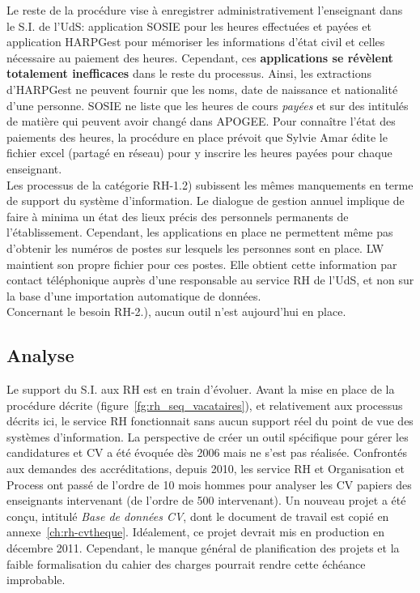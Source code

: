 \documentclass{book}
\begin{document}
Le reste de la procédure vise à enregistrer administrativement l'enseignant
dans le S.I. de l'UdS: application SOSIE pour les heures effectuées et payées
et application HARPGest pour mémoriser les informations d'état civil et celles
nécessaire au paiement des heures. 
Cependant, ces \textbf{applications se révèlent totalement inefficaces} dans 
le reste du processus. Ainsi, les extractions d'HARPGest ne peuvent fournir
que les noms, date de naissance et nationalité d'une personne. SOSIE ne liste
que les heures de cours \emph{payées} et sur des intitulés de matière qui
peuvent avoir changé dans APOGEE.
Pour connaître l'état des paiements des heures, la procédure en place prévoit
que Sylvie Amar édite le fichier excel (partagé en réseau) pour y inscrire 
les heures payées pour chaque enseignant.\\

Les processus de la catégorie RH-1.2) subissent les mêmes manquements en terme
de support du système d'information. Le dialogue de gestion annuel implique
de faire à minima un état des lieux précis des personnels permanents de 
l'établissement. Cependant, les applications en place ne permettent même pas
d'obtenir les numéros de postes sur lesquels les personnes sont en place.
LW maintient son propre fichier pour ces postes. Elle obtient cette information
par contact téléphonique auprès d'une responsable au service RH de l'UdS, et
non sur la base d'une importation automatique de données.\\

Concernant le besoin RH-2.), aucun outil n'est aujourd'hui en place.

\subsection{Analyse}
\label{sc:rh-analyse}
Le support du S.I. aux RH est en train d'évoluer. Avant la mise en place
de la procédure décrite (figure~\ref{fg:rh_seq_vacataires}), et relativement 
aux processus décrits ici, le service RH fonctionnait sans aucun support réel 
du point de vue des systèmes d'information. La perspective de créer un outil 
spécifique pour gérer les candidatures et CV a été évoquée dès 2006 mais ne 
s'est pas réalisée. 
Confrontés aux demandes des accréditations, depuis 2010, les service RH et
Organisation et Process ont passé de l'ordre de 10 mois hommes pour analyser 
les CV papiers des enseignants intervenant (de l'ordre de 500 intervenant). 
Un nouveau projet a été conçu, intitulé \textit{Base de données CV}, dont 
le document de travail est copié en annexe~\ref{ch:rh-cvtheque}.
Idéalement, ce projet devrait mis en production en décembre 2011. 
Cependant, le manque général de planification des projets et la faible 
formalisation du cahier des charges pourrait rendre cette échéance improbable.\\
\end{document}
